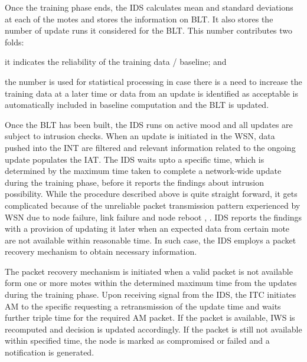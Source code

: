 \documentclass[conference,final]{IEEEtran}
\begin{document}
Once the training phase ends, the IDS calculates mean and standard deviations at each of the motes and stores the  information on BLT.
It also stores the number of update runs it considered for the BLT.
This number contributes two folds:
\begin{inparaenum}
\item it indicates the reliability of the training data / baseline; and
\item the number is used for statistical processing in case there is a need to increase the training data at a later time or data from an update is identified as acceptable is automatically included in baseline computation and the BLT is updated.
\end{inparaenum}
Once the BLT has been built, the IDS runs on active mood and all updates are subject to intrusion checks.
When an update is initiated in the WSN, data pushed into the INT are filtered and relevant information related to the ongoing update populates the  IAT.
The IDS waits upto a specific time, which is determined by the maximum time taken to complete a network-wide  update during the training phase, before it reports the findings about intrusion possibility.
While the procedure described above is quite straight forward, it gets complicated because of the unreliable packet transmission pattern experienced by WSN due to node failure, link failure and node reboot \cite{aro04}, \cite{bec04}.
IDS reports the findings with a provision of updating it later when an expected data from certain mote are not available within reasonable time.
In such case, the IDS employs a packet recovery mechanism to obtain necessary information.

The packet recovery mechanism is initiated when a valid packet is not available form one or more motes within  the  determined maximum time from the updates  during the training phase.
Upon receiving signal from the IDS, the ITC initiates AM to the specific requesting a retransmission of the update time and waits further  triple time for the required AM packet. If the packet is available,  IWS is recomputed and decision is updated accordingly.
If the packet is still not available within specified time, the node is marked as compromised or failed and a notification is generated.



\end{document}
